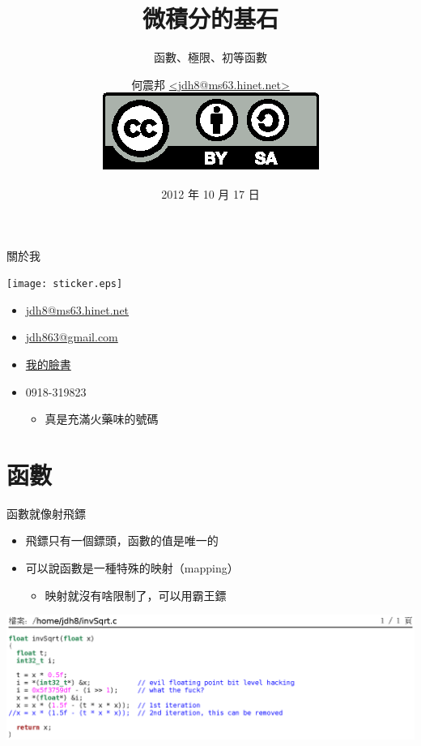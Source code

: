 \documentclass{beamer}
\begin{document}
\begin{CJK}{UTF8}{bsmi}
\title{微積分的基石}
\subtitle{函數、極限、初等函數}
\author[何震邦]{何震邦 \href{mailto:jdh8@ms63.hinet.net}{\textless jdh8@ms63.hinet.net\textgreater}\\
    \href{http://creativecommons.org/licenses/by-sa/3.0/tw/deed.zh\textunderscore TW}{\includegraphics{by-sa.eps}}}
\date{2012 年 10 月 17 日}
\maketitle

\begin{frame}{關於我}
  \begin{center}
    \texttt{[image: sticker.eps]}
  \end{center}
  \begin{itemize}
    \item \href{mailto:jdh8@ms63.hinet.net}{jdh8@ms63.hinet.net}
    \item \href{mailto:jdh863@gmail.com}{jdh863@gmail.com}
    \item \href{http://www.facebook.com/jdh8.fr}{我的臉書}
    \item 0918-319823
      \begin{itemize}
	\item 真是充滿火藥味的號碼
      \end{itemize}
  \end{itemize}
\end{frame}

\section{函數}
\begin{frame}{函數就像射飛鏢}
  \begin{itemize}
    \item 飛鏢只有一個鏢頭，函數的值是唯一的
    \item 可以說函數是一種特殊的映射（mapping）
    \begin{itemize}
      \item 映射就沒有啥限制了，可以用霸王鏢
    \end{itemize}
  \end{itemize}
  \begin{center}
    \includegraphics[width=\textwidth]{invSqrt.ps}
  \end{center}
\end{frame}


\end{CJK}
\end{document}
